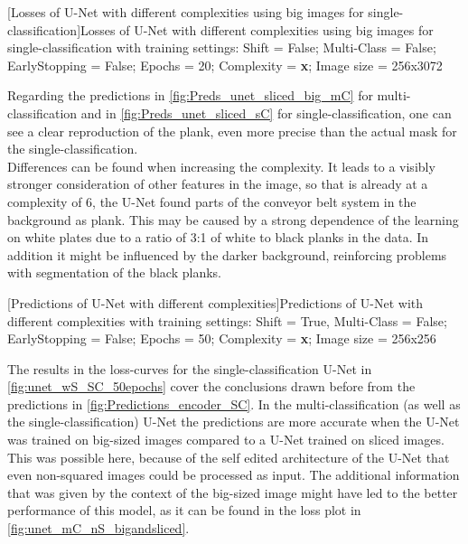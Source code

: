 \begin{minipage}{\textwidth}
    \hspace{-0.8cm}
	
	[Losses of U-Net with different complexities using big images for single-classification]{Losses of U-Net with different complexities using big images for single-classification with training settings: Shift = False; Multi-Class = False; EarlyStopping = False; Epochs = 20; Complexity = \textbf{x}; Image size = 256x3072}
	\label{fig:unet_nS_sC_big}
	\vspace{5mm}
\end{minipage}
Regarding the predictions in \cref{fig:Preds_unet_sliced_big_mC} for multi-classification and in \cref{fig:Preds_unet_sliced_sC} for single-classification, one can see a clear reproduction of the plank, even more precise than the actual mask for the single-classification.\\
Differences can be found when increasing the complexity. It leads to a visibly stronger consideration of other features in the image, so that is already at a complexity of 6, the U-Net found parts of the conveyor belt system in the background as plank. This may be caused by a strong dependence of the learning on white plates due to a ratio of 3:1 of white to black planks in the data. In addition it might be influenced by the darker background, reinforcing problems with segmentation of the black planks.\\
\begin{minipage}{\textwidth}
    \hspace{0.2cm}
	[Predictions of U-Net with different complexities]{Predictions of U-Net with different complexities with training settings: Shift = True, Multi-Class = False; EarlyStopping = False; Epochs = 50; Complexity = \textbf{x}; Image size = 256x256}
	\label{fig:Preds_unet_sliced_sC}
	\vspace{5mm}
\end{minipage}
The results in the loss-curves for the single-classification U-Net in \cref{fig:unet_wS_SC_50epochs} cover the conclusions drawn before from the predictions in \cref{fig:Predictions_encoder_SC}. In the multi-classification (as well as the single-classification) U-Net the predictions are more accurate when the U-Net was trained on big-sized images compared to a U-Net trained on sliced images. This was possible here, because of the self edited architecture of the U-Net that even non-squared images could be processed as input. The additional information that was given by the context of the big-sized image might have led to the better performance of this model, as it can be found in the loss plot in \cref{fig:unet_mC_nS_bigandsliced}.\\
